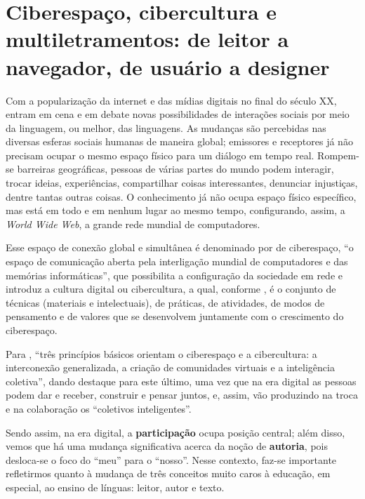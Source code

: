 \section{Ciberespaço, cibercultura e multiletramentos: de leitor a navegador, de 
	usuário a designer}\label{sec-ciberespaço,cibercultura}
	
	Com a popularização da internet e das mídias digitais no final do século XX, entram em cena e em debate novas possibilidades de interações sociais por meio da linguagem, ou melhor, das linguagens. As mudanças são percebidas nas diversas esferas sociais humanas de maneira global; emissores e receptores já não precisam ocupar o mesmo espaço físico para um diálogo em tempo real. Rompem-se barreiras geográficas, pessoas de várias partes do mundo podem interagir, trocar ideias, experiências, compartilhar coisas interessantes, denunciar injustiças, dentre tantas outras coisas. O conhecimento já não ocupa espaço físico específico, mas está em todo e em nenhum lugar ao mesmo tempo, configurando, assim, a \textit{World Wide Web}, a grande rede mundial de computadores.
	
	Esse espaço de conexão global e simultânea é denominado por \textcite[p. 95]{levy_cibercultura_2000} de ciberespaço, “o espaço de comunicação aberta pela interligação mundial de computadores e das memórias informáticas”, que possibilita a configuração da sociedade em rede \cite{castells_sociedade_2003} e introduz a cultura digital ou cibercultura, a qual, conforme \textcite[p. 17]{levy_cibercultura_2000}, é o {\textquotedbl}conjunto de técnicas (materiais e intelectuais), de práticas, de atividades, de modos de pensamento e de valores que se desenvolvem juntamente com o crescimento do ciberespaço{\textquotedbl}.
	
	Para \textcite[p. 19]{lima_hipertexto:_2016}, “três princípios básicos orientam o ciberespaço e a cibercultura: a interconexão generalizada, a criação de comunidades virtuais e a inteligência coletiva”, dando destaque para este último, uma vez que na era digital as pessoas podem dar e receber, construir e pensar juntos, e, assim, vão produzindo na troca e na colaboração os “coletivos inteligentes”.
	
	Sendo assim, na era digital, a \textbf{participação} ocupa posição central; além disso, vemos que há uma mudança significativa acerca da noção de \textbf{autoria}, pois desloca-se o foco do “meu” para o “nosso”. Nesse contexto, faz-se importante refletirmos quanto à mudança de três conceitos muito caros à educação, em especial, ao ensino de línguas: leitor, autor e texto.
	
